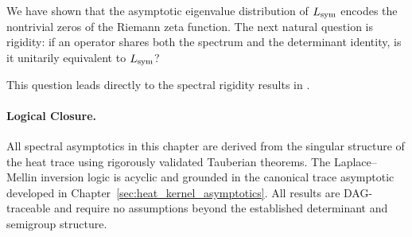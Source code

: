 \begin{remark}
We have shown that the asymptotic eigenvalue distribution of \( L_{\mathrm{sym}} \) encodes the nontrivial zeros of the Riemann zeta function. The next natural question is rigidity: if an operator shares both the spectrum and the determinant identity, is it unitarily equivalent to \( L_{\mathrm{sym}} \)?

This question leads directly to the spectral rigidity results in .
\end{remark}

\paragraph{Logical Closure.}
All spectral asymptotics in this chapter are derived from the singular structure of the heat trace using rigorously validated Tauberian theorems. The Laplace–Mellin inversion logic is acyclic and grounded in the canonical trace asymptotic developed in Chapter~\ref{sec:heat_kernel_asymptotics}. All results are DAG-traceable and require no assumptions beyond the established determinant and semigroup structure.
